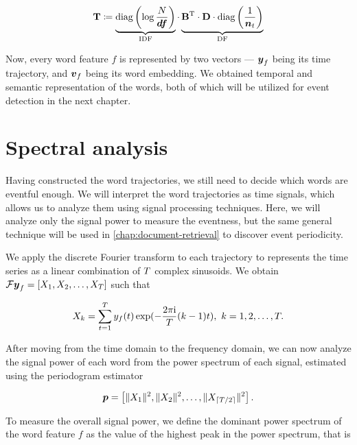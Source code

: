 \begin{equation}
	\trajmat \coloneqq
		\underbrace{\text{diag} \left( \log{\frac{\doccount}{\vect{\df}}} \right)}_{\text{IDF}}
		\cdot
		\underbrace{\bowmat^{\T}
		\cdot \dtdmat
		\cdot \text{diag} \left( \frac{1}{\vect{\doccount}_{t}} \right)}_{\text{DF}}
\end{equation}

Now, every word feature $f$ is represented by two vectors --- $\vect{\traj}_{f}$ being its time trajectory, and $\embed_{f}$ being its word embedding. We obtained temporal and semantic representation of the words, both of which will be utilized for event detection in the next chapter.


\section{Spectral analysis}
Having constructed the word trajectories, we still need to decide which words are eventful enough. We will interpret the word trajectories as time signals, which allows us to analyze them using signal processing techniques. Here, we will analyze only the signal power to measure the eventness, but the same general technique will be used in \autoref{chap:document-retrieval} to discover event periodicity.

We apply the discrete Fourier transform to each trajectory to represents the time series as a linear combination of $T$ complex sinusoids. We obtain $\mathcal{F} \vect{\traj}_{f} = \left[ X_{1}, X_{2}, \dots, X_{\streamlen}\right ]$ such that

\begin{equation*}
	X_{k} = \sum_{t = 1}^{T}{y_{f}(t) \exp(- \frac{2 \pi \mathrm{i}}{T} (k - 1) t}), ~ k = 1, 2, \dots, T.
\end{equation*}

After moving from the time domain to the frequency domain, we can now analyze the signal power of each word from the power spectrum of each signal, estimated using the periodogram estimator

\begin{equation*}
	\vect{P} = \left[ \|X_{1}\|^{2}, \|X_{2}\|^{2}, \dots, \|X_{\ceil{\streamlen / 2}}\|^{2} \right].
\end{equation*}

To measure the overall signal power, we define the dominant power spectrum of the word feature $f$ as the value of the highest peak in the power spectrum, that is

